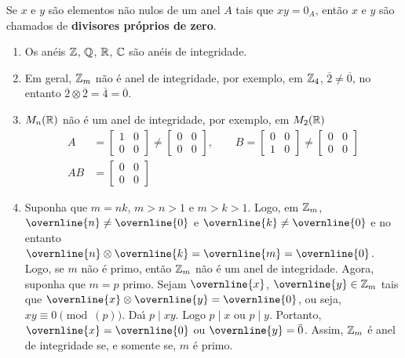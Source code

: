 \begin{observacao}
	Se $x$ e $y$ s{\~a}o elementos n{\~a}o nulos de um anel $A$ tais que $xy = 0_A$, ent{\~a}o $x$ e $y$ s{\~a}o chamados de \textbf{divisores pr{\'o}prios de zero}.
\end{observacao}


\begin{exemplos}
	\begin{enumerate}[label={\arabic*})]
		\item Os an{\'e}is $\mathbb{Z}$, $\mathbb{Q}$, $\mathbb{R}$, $\mathbb{C}$ s{\~a}o an{\'e}is de integridade.
		
		\item Em geral, $\mathbb{Z}_m$ n{\~a}o {\'e} anel de integridade, por exemplo, em $\mathbb{Z}_4$, $\overline{2} \neq \overline{0}$, no entanto $\overline{2}\otimes \overline{2} = \overline{4} = \overline{0}$.
		
		\item $M_{n}(\mathbb{R})$ n{\~a}o {\'e} um anel de integridade, por exemplo, em $M_{2}(\mathbb{R})$
		\begin{align*}
			A &= \begin{bmatrix}
				1 & 0\\
				0 & 0
			\end{bmatrix} \neq \begin{bmatrix}
				0 & 0\\
				0 & 0		
			\end{bmatrix},\qquad 
			B = \begin{bmatrix}
				0 & 0\\
				1 & 0
			\end{bmatrix} \neq \begin{bmatrix}
				0 & 0\\
				0 & 0
			\end{bmatrix}\\
			AB & =\begin{bmatrix}
				0 & 0\\
				0 & 0
			\end{bmatrix}
		\end{align*}

		\item Suponha que $m = nk$, $m > n > 1$ e $m > k > 1$. Logo, em $\mathbb{Z}_m$, $\overnline{n} \neq \overnline{0}$ e $\overnline{k} \neq \overnline{0}$ e no entanto $\overnline{n} \otimes \overnline{k} = \overnline{m} = \overnline{0}$. Logo, se $m$ n{\~a}o {\'e} primo, ent{\~a}o $\mathbb{Z}_m$ n{\~a}o {\'e} um anel de integridade. Agora, suponha que $m = p$ primo. Sejam $\overnline{x}$, $\overnline{y} \in \z_m$ tais que $\overnline{x}\otimes \overnline{y} = \overnline{0}$, ou seja, $xy \equiv 0 \pmod(p)$. Da{\'\i} $p\mid xy$. Logo $p\mid x$ ou $p\mid y$. Portanto, $\overnline{x} = \overnline{0}$ ou $\overnline{y} = \bar{0}$. Assim, $\mathbb{Z}_m$ {\'e} anel de integridade se, e somente se, $m$ {\'e} primo.
	\end{enumerate}
\end{exemplos}



